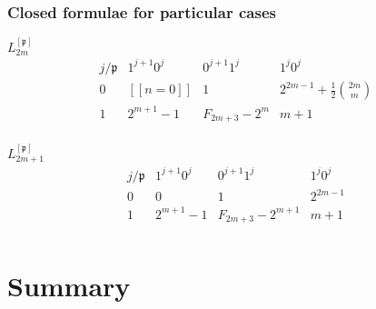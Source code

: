 \documentclass{beamer}
\begin{document}
\begin{frame}\frametitle{Closed formulae for particular cases}
\begin{block}{$L_{2m}^{[\mathfrak{p}]}$}
\begin{displaymath}
\begin{array}{c|ccc}
j/\mathfrak{p} & {1^{j+1}0^{j}} & {0^{j+1}1^{j}} & {1^{j}0^{j}} \\
\hline
0 &  [\![n = 0]\!] &  1 & 2^{2m-1} + \frac{1}{2}{ {2m}\choose{m} } \\
1 &  2^{m+1} -1 &  F_{2m+3}-2^{m} & m+1 \\
\end{array}{}
\end{displaymath}
\end{block}

\begin{block}{$L_{2m+1}^{[\mathfrak{p}]}$}
\begin{displaymath}
\begin{array}{c|ccc}
j/\mathfrak{p} & {1^{j+1}0^{j}} & {0^{j+1}1^{j}} & {1^{j}0^{j}} \\
\hline
0 &  0 &  1 & 2^{2m-1} \\
1 &  2^{m+1} -1 & F_{2m+3}-2^{m+1} & m+1 \\
\end{array}{}
\end{displaymath}
\end{block}
\end{frame}

\section*{Summary}
\end{document}
